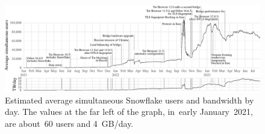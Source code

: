 \documentclass[letterpaper,twocolumn]{article}
\begin{document}
\begin{figure}[t]
\includegraphics{figures/users/users-global}
\caption{
Estimated average simultaneous Snowflake users and bandwidth by day.
The values at the far left of the graph,
in~early January~2021, are about~60 users
and 4~GB/day.
}
\end{figure}
\end{document}
